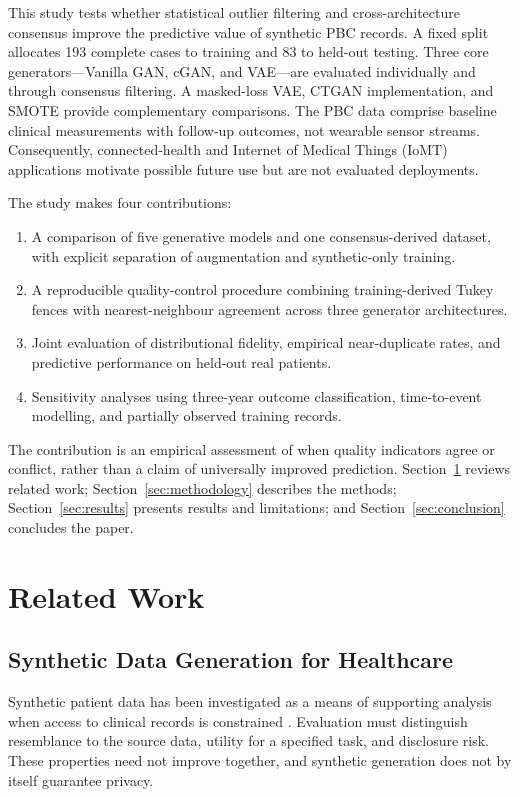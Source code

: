 \documentclass[journal]{IEEEtran}
\begin{document}
This study tests whether statistical outlier filtering and cross-architecture consensus improve the predictive value of synthetic PBC records. A fixed split allocates 193 complete cases to training and 83 to held-out testing. Three core generators---Vanilla GAN, cGAN, and VAE---are evaluated individually and through consensus filtering. A masked-loss VAE, CTGAN implementation, and SMOTE provide complementary comparisons. The PBC data comprise baseline clinical measurements with follow-up outcomes, not wearable sensor streams. Consequently, connected-health and Internet of Medical Things (IoMT) applications motivate possible future use but are not evaluated deployments.

The study makes four contributions:
\begin{enumerate}
\item A comparison of five generative models and one consensus-derived dataset, with explicit separation of augmentation and synthetic-only training.
\item A reproducible quality-control procedure combining training-derived Tukey fences with nearest-neighbour agreement across three generator architectures.
\item Joint evaluation of distributional fidelity, empirical near-duplicate rates, and predictive performance on held-out real patients.
\item Sensitivity analyses using three-year outcome classification, time-to-event modelling, and partially observed training records.
\end{enumerate}
The contribution is an empirical assessment of when quality indicators agree or conflict, rather than a claim of universally improved prediction. Section~\ref{sec:related} reviews related work; Section~\ref{sec:methodology} describes the methods; Section~\ref{sec:results} presents results and limitations; and Section~\ref{sec:conclusion} concludes the paper.

\FloatBarrier

\section{Related Work}
\label{sec:related}

\subsection{Synthetic Data Generation for Healthcare}

Synthetic patient data has been investigated as a means of supporting analysis when access to clinical records is constrained \cite{goncalves2020,gonzales2023,guillaudeux2023}. Evaluation must distinguish resemblance to the source data, utility for a specified task, and disclosure risk. These properties need not improve together, and synthetic generation does not by itself guarantee privacy.
\end{document}
